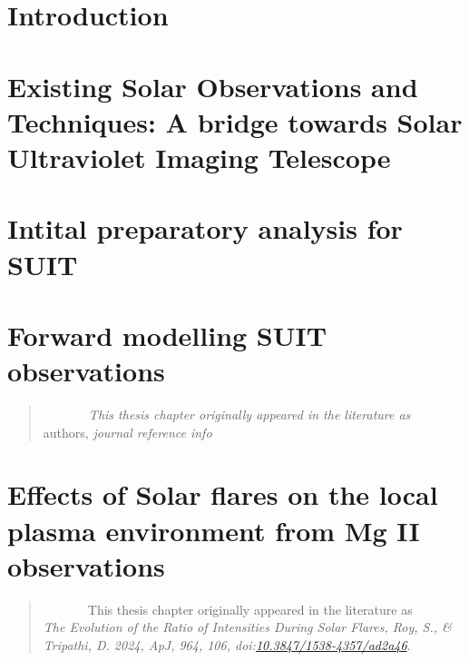 \documentclass[keepsake]{hvdthesis}
\begin{document}

\mainmatter
\pagestyle{fancy}


%
%

\chapter[Introduction]{Introduction}\label{c:intro}

\clearpage
%
\chapter{Existing Solar Observations and Techniques: A bridge towards Solar Ultraviolet Imaging Telescope}\label{c:chap2}

\clearpage
%
\chapter{Intital preparatory analysis for SUIT}\label{c:chap3}

\clearpage
%
\chapter{Forward modelling SUIT observations}\label{c:chap4}
\begin{quote}
{\em ~~~~~~~This thesis chapter originally appeared in the literature as} \\
{authors,
{\em journal reference info}}
\end{quote}


%
\chapter{Effects of Solar flares on the local plasma environment from Mg II observations}\label{c:chap5}
\begin{quote}
{ ~~~~~~~This thesis chapter originally appeared in the literature as} \\
{{\em The Evolution of the Ratio of  Intensities During Solar Flares, Roy, S., \& Tripathi, D. 2024, ApJ, 964, 106, doi:\href{https://iopscience.iop.org/article/10.3847/1538-4357/ad2a46}{10.3847/1538-4357/ad2a46}}.}
\end{quote}

\clearpage
%
\end{document}
